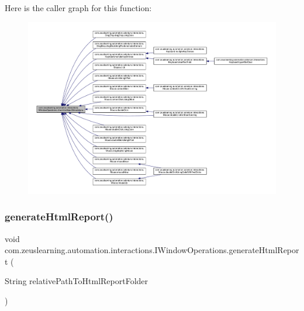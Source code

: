 Here is the caller graph for this function\+:
\nopagebreak
\begin{figure}[H]
\begin{center}
\leavevmode
\includegraphics[width=350pt]{d3/d71/interfacecom_1_1zeuslearning_1_1automation_1_1interactions_1_1IWindowOperations_a6f5627a3145238d63f310c22d2e3c6e5_icgraph}
\end{center}
\end{figure}
\hypertarget{interfacecom_1_1zeuslearning_1_1automation_1_1interactions_1_1IWindowOperations_a7dba40c542d25adae5781f035e4dbb42}{}\label{interfacecom_1_1zeuslearning_1_1automation_1_1interactions_1_1IWindowOperations_a7dba40c542d25adae5781f035e4dbb42} 
\subsubsection{\texorpdfstring{generate\+Html\+Report()}{generateHtmlReport()}\hspace{0.1cm}{\footnotesize\ttfamily [1/2]}}
{\footnotesize\ttfamily void com.\+zeuslearning.\+automation.\+interactions.\+I\+Window\+Operations.\+generate\+Html\+Report (\begin{DoxyParamCaption}\item[{String}]{relative\+Path\+To\+Html\+Report\+Folder }\end{DoxyParamCaption})}

